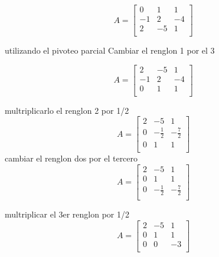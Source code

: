 \documentclass{article}
\begin{document}
\[
    A=
    \begin{bmatrix}
        0 & 1  & 1   \\
        -1 & 2  & -4   \\
        2 & -5  & 1   \\
    \end{bmatrix}
\]

utilizando el pivoteo parcial
Cambiar el renglon 1 por el 3

\[
    A=
    \begin{bmatrix}
        2 & -5  & 1   \\
        -1 & 2  & -4   \\
        0 & 1  & 1   \\
    \end{bmatrix}
\]

multriplicarlo el renglon 2 por 1/2
\[
    A=
    \begin{bmatrix}
        2 & -5  & 1   \\
        0 & -\frac{1}{2}  & -\frac{7}{2}   \\
        0 & 1  & 1   \\
    \end{bmatrix}
\]
cambiar el renglon dos por el tercero
\[
    A=
    \begin{bmatrix}
        2 & -5  & 1   \\
        0 & 1  & 1   \\
        0 & -\frac{1}{2}  & -\frac{7}{2}   \\
    \end{bmatrix}
\]

multriplicar el 3er renglon por 1/2
\[
    A=
    \begin{bmatrix}
        2 & -5  & 1   \\
        0 & 1  & 1   \\
        0 & 0 & -3   \\
    \end{bmatrix}
\]
\end{document}
